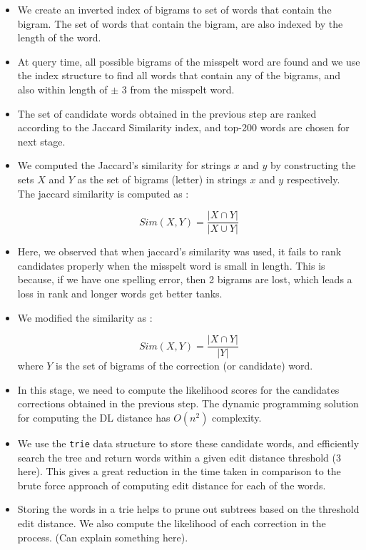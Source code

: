 \begin{flushleft}
\begin{itemize}
\item We create an inverted index of bigrams to set of words that contain the bigram. The set of words that contain the bigram, are also indexed by the length of the word. 
\item At query time, all possible bigrams of the misspelt word are found and we use the index structure to find all words that contain any of the bigrams, and also within length of $\pm$ 3 from the misspelt word. 
\item The set of candidate words obtained in the previous step are ranked according to the Jaccard Similarity index, and top-200 words are chosen for next stage.
\item We computed the Jaccard's similarity for strings $x$ and $y$ by constructing the sets $X$ and $Y$ as the set of bigrams (letter) in strings $x$ and $y$ respectively. The jaccard similarity is computed as :

\[Sim(X,Y) = \frac{|X \cap Y|}{|X \cup Y|} \] 

\item Here, we observed that when jaccard's similarity was used, it fails to rank candidates properly when the misspelt word is small in length. This is because, if we have one spelling error, then 2 bigrams are lost, which leads a loss in rank and longer words get better tanks.
\item We modified the similarity as :

\[Sim(X,Y) = \frac{|X \cap Y|}{|Y|} \] 
 where $Y$ is the set of bigrams of the correction (or candidate) word.

\item In this stage, we need to compute the likelihood scores for the candidates corrections obtained in the previous step. The dynamic programming solution for computing the DL distance has $O(n^2)$ complexity.
\item We use the \texttt{trie} data structure to store these candidate words, and efficiently search the tree and return words within a given edit distance threshold (3 here). This gives a great reduction in the time taken in comparison to the brute force approach of computing edit distance for each of the words.

\item Storing the words in a trie helps to prune out subtrees based on the threshold edit distance. We also compute the likelihood of each correction in the process. (Can explain something here).


\end{itemize}
\end{flushleft}
